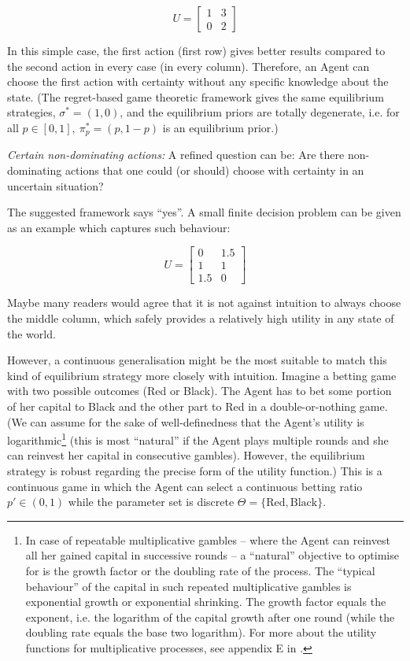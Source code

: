 \documentclass{article}
\begin{document}
\[
U =
\begin{bmatrix}
    1 & 3 \\
    0 & 2
\end{bmatrix}
\]

In this simple case, the first action (first row) gives better results compared to the second action in every case (in every column). Therefore, an Agent can choose the first action with certainty without any specific knowledge about the state.
(The regret-based game theoretic framework gives the same equilibrium strategies, $\sigma^* = (1,0)$, and the equilibrium priors are totally degenerate, i.e. for all $p \in [0,1], \ \pi^*_p = (p,1-p)$ is an equilibrium prior.)

{\it Certain non-dominating actions:}
A refined question can be: Are there non-dominating actions that one could (or should) choose with certainty in an uncertain situation?

The suggested framework says ``yes''. A small finite decision problem can be given as an example which captures such behaviour: 

\[
U =
\begin{bmatrix}
    0 & 1.5 \\
    1 & 1 \\
    1.5 & 0
\end{bmatrix}
\]

Maybe many readers would agree that it is not against intuition to always choose the middle column, which safely provides a relatively high utility in any state of the world.

However, a continuous generalisation might be the most suitable to match this kind of equilibrium strategy more closely with intuition.
Imagine a betting game with two possible outcomes (Red or Black). The Agent has to bet some portion of her capital to Black and the other part to Red in a double-or-nothing game.
(We can assume for the sake of well-definedness that the Agent's utility is logarithmic\footnote{In case of repeatable multiplicative gambles -- where the Agent can reinvest all her gained capital in successive rounds -- a ``natural'' objective to optimise for is the growth factor \cite{Kelly} or the doubling rate \cite{book:InformationTheory} of the process. The ``typical behaviour'' of the capital in such repeated multiplicative gambles is exponential growth or exponential shrinking. The growth factor equals the exponent, i.e. the logarithm of the capital growth after one round (while the doubling rate equals the base two logarithm). For more about the utility functions for multiplicative processes, see appendix E in \cite{arxiv:StatisticalGamesKonczer2024}.} (this is most ``natural'' if the Agent plays multiple rounds and she can reinvest her capital in consecutive gambles). However, the equilibrium strategy is robust regarding the precise form of the utility function.)
This is a continuous game in which the Agent can select a continuous betting ratio $p' \in (0,1)$ while the parameter set is discrete $\Theta = \{\text{Red},\text{Black}\}$.
\end{document}
